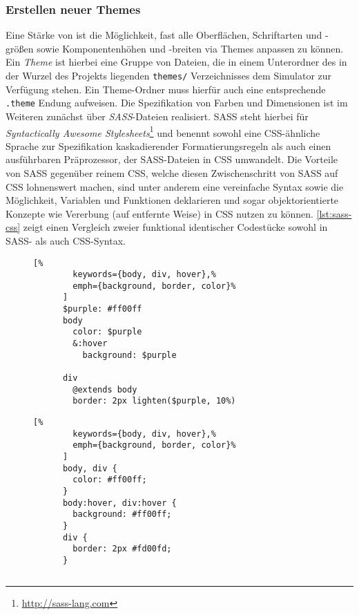 \subsubsection{Erstellen neuer Themes}
\vspace{-0.2cm}

Eine Stärke von \erasim{} ist die Möglichkeit, fast alle Oberflächen,
Schriftarten und -größen sowie Komponentenhöhen und -breiten via Themes anpassen
zu können. Ein \emph{Theme} ist hierbei eine Gruppe von Dateien, die in einem
Unterordner des in der Wurzel des Projekts liegenden \texttt{themes/}
Verzeichnisses dem Simulator zur Verfügung stehen. Ein Theme-Ordner muss hierfür
auch eine entsprechende \texttt{.theme} Endung aufweisen. Die Spezifikation von
Farben und Dimensionen ist im Weiteren zunächst über \emph{SASS}-Dateien
realisiert. SASS steht hierbei für \emph{Syntactically Awesome
Stylesheets}\footnote{\url{http://sass-lang.com}} und benennt sowohl eine
CSS-ähnliche Sprache zur Spezifikation kaskadierender Formatierungsregeln als
auch einen ausführbaren Präprozessor, der SASS-Dateien in CSS umwandelt. Die
Vorteile von SASS gegenüber reinem CSS, welche diesen Zwischenschritt von SASS
auf CSS lohnenswert machen, sind unter anderem eine vereinfache Syntax sowie die
Möglichkeit, Variablen und Funktionen deklarieren und sogar objektorientierte
Konzepte wie Vererbung (auf entfernte Weise) in CSS nutzen zu können.
\autoref{lst:sass-css} zeigt einen Vergleich zweier funktional
identischer Codestücke sowohl in SASS- als auch CSS-Syntax.
\begin{figure}[h!]
  \begin{minipage}{0.5\textwidth}
    \begin{lstlisting}[%
        keywords={body, div, hover},%
        emph={background, border, color}%
      ]
      $purple: #ff00ff
      body
        color: $purple
        &:hover
          background: $purple

      div
        @extends body
        border: 2px lighten($purple, 10%)
    \end{lstlisting}
  \end{minipage}
  \begin{minipage}{0.5\textwidth}
    \begin{lstlisting}[%
        keywords={body, div, hover},%
        emph={background, border, color}%
      ]
      body, div {
        color: #ff00ff;
      }
      body:hover, div:hover {
        background: #ff00ff;
      }
      div {
        border: 2px #fd00fd;
      }
    \end{lstlisting}
  \end{minipage}
  \begin{lstlisting}[label={lst:sass-css}, caption={Diese beiden Codebeispiele geben einen Vergleich eines kurzen Codeausschnitts,
  links in SASS- und rechts in CSS-Syntax. Das SASS Beispiel profitiert klar von
  der Verwendung von Variablen, Funktionen und der Möglichkeit, Selektoren
  voneinander "erben" zu lassen.}]
  \end{lstlisting}
  \vspace{-1cm}
\end{figure}

